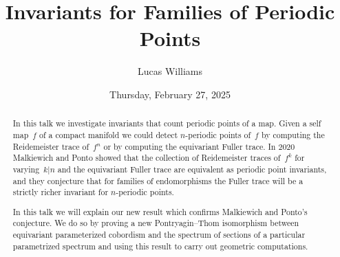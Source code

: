 \documentclass{UAmathtalk}
\author{Lucas Williams}
\title{Invariants for Families of Periodic Points}
\date{Thursday, February 27, 2025}
\begin{document}
\maketitle

\begin{abstract}
In this talk we investigate invariants that count periodic points of a map. Given a self map~$f$ of a compact manifold we could detect $n$-periodic points of~$f$ by computing the Reidemeister trace of~$f^n$ or by computing the equivariant Fuller trace. In 2020 Malkiewich and Ponto showed that the collection of Reidemeister traces of~$f^k$ for varying~$k|n$ and the equivariant Fuller trace are equivalent as periodic point invariants, and they conjecture that for families of endomorphisms the Fuller trace will be a strictly richer invariant for $n$-periodic points. 

In this talk we will explain our new result which confirms Malkiewich and Ponto’s conjecture. We do so by proving a new Pontryagin–Thom isomorphism between equivariant parameterized cobordism and the spectrum of sections of a particular parametrized spectrum and using this result to carry out geometric computations.
\end{abstract}
\end{document}
